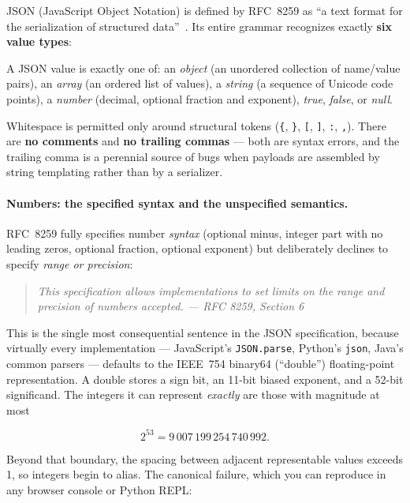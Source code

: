 JSON (JavaScript Object Notation) is defined by RFC~8259 as ``a text format for the
serialization of structured data''~\cite{rfc8259}. Its entire grammar recognizes
exactly \textbf{six value types}:

\begin{definition}
A JSON value is exactly one of: an \emph{object} (an unordered collection of
name/value pairs), an \emph{array} (an ordered list of values), a \emph{string}
(a sequence of Unicode code points), a \emph{number} (decimal, optional fraction and
exponent), \emph{true}, \emph{false}, or \emph{null}.
\end{definition}

Whitespace is permitted only around structural tokens (\texttt{\{}, \texttt{\}},
\texttt{[}, \texttt{]}, \texttt{:}, \texttt{,}). There are \textbf{no comments} and
\textbf{no trailing commas} --- both are syntax errors, and the trailing comma is a
perennial source of bugs when payloads are assembled by string templating rather than
by a serializer.

\paragraph{Numbers: the specified syntax and the unspecified semantics.}
RFC~8259 fully specifies number \emph{syntax} (optional minus, integer part with no
leading zeros, optional fraction, optional exponent) but deliberately declines to
specify \emph{range or precision}:

\begin{quote}
\itshape This specification allows implementations to set limits on the range and
precision of numbers accepted. \hfill --- RFC 8259, Section 6~\cite{rfc8259}
\end{quote}

This is the single most consequential sentence in the JSON specification, because
virtually every implementation --- JavaScript's \texttt{JSON.parse}, Python's
\texttt{json}, Java's common parsers --- defaults to the IEEE~754 binary64
(``double'') floating-point representation. A double stores a sign bit, an 11-bit
biased exponent, and a 52-bit significand. The integers it can represent
\emph{exactly} are those with magnitude at most

\[
2^{53} = 9\,007\,199\,254\,740\,992.
\]

Beyond that boundary, the spacing between adjacent representable values exceeds 1, so
integers begin to alias. The canonical failure, which you can reproduce in any
browser console or Python REPL:

